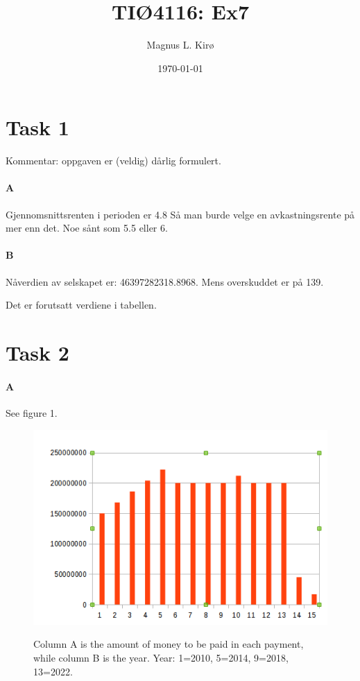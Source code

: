 \documentclass[12pt, a4paper]{article}
\title{
TIØ4116: Ex7
}
\author{
	Magnus L. Kirø \\
}
\date{\today}
\begin{document}
\maketitle
{}

\section{Task 1}
Kommentar: oppgaven er (veldig) dårlig formulert.

\paragraph{A}
Gjennomsnittsrenten i perioden er 4.8
Så man burde velge en avkastningsrente på mer enn det. Noe sånt som 5.5 eller
6. 

\paragraph{B}
Nåverdien av selskapet er: 46397282318.8968. Mens overskuddet er på 139. 

Det er forutsatt verdiene i tabellen. 

\section{Task 2}
\paragraph{A} See figure 1.
\begin{figure}[h]
    \centering
    \includegraphics[width=\textwidth]{betstrom} 
    \label{fig:betstrom}
    \caption{}
Column A is the amount of money to be paid in each payment, while column B is
the year. Year: 1=2010, 5=2014, 9=2018, 13=2022.
\end{figure}
\end{document}
